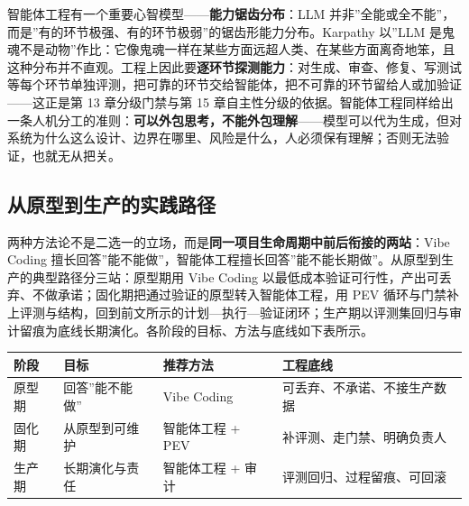 \documentclass[12pt,a4paper,twoside,openany]{ctexbook}
\numberwithin{figure}{chapter}
\numberwithin{table}{chapter}
\newcounter{none}
\begin{document}
智能体工程有一个重要心智模型------\textbf{能力锯齿分布}：LLM
并非''全能或全不能''，而是''有的环节极强、有的环节极弱''的锯齿形能力分布。Karpathy
以''LLM
是鬼魂不是动物''作比：它像鬼魂一样在某些方面远超人类、在某些方面离奇地笨，且这种分布并不直观。工程上因此要\textbf{逐环节探测能力}：对生成、审查、修复、写测试等每个环节单独评测，把可靠的环节交给智能体，把不可靠的环节留给人或加验证------这正是第
13 章分级门禁与第 15
章自主性分级的依据。智能体工程同样给出一条人机分工的准则：\textbf{可以外包思考，不能外包理解}------模型可以代为生成，但对系统为什么这么设计、边界在哪里、风险是什么，人必须保有理解；否则无法验证，也就无从把关。

\subsection{从原型到生产的实践路径}\label{ux4eceux539fux578bux5230ux751fux4ea7ux7684ux5b9eux8df5ux8defux5f84}

两种方法论不是二选一的立场，而是\textbf{同一项目生命周期中前后衔接的两站}：Vibe
Coding
擅长回答''能不能做''，智能体工程擅长回答''能不能长期做''。从原型到生产的典型路径分三站：原型期用
Vibe Coding
以最低成本验证可行性，产出可丢弃、不做承诺；固化期把通过验证的原型转入智能体工程，用
PEV
循环与门禁补上评测与结构，回到前文所示的计划---执行---验证闭环；生产期以评测集回归与审计留痕为底线长期演化。各阶段的目标、方法与底线如下表所示。

{\def\LTcaptype{none} %
\begin{longtable}[]{@{}
  >{\raggedright\arraybackslash}p{}
  >{\raggedright\arraybackslash}p{}
  >{\raggedright\arraybackslash}p{}
  >{\raggedright\arraybackslash}p{}@{}}
\toprule\noalign{}
\begin{minipage}[b]{\linewidth}\raggedright
阶段
\end{minipage} & \begin{minipage}[b]{\linewidth}\raggedright
目标
\end{minipage} & \begin{minipage}[b]{\linewidth}\raggedright
推荐方法
\end{minipage} & \begin{minipage}[b]{\linewidth}\raggedright
工程底线
\end{minipage} \\
\midrule\noalign{}
\endhead
\bottomrule\noalign{}
\endlastfoot
原型期 & 回答''能不能做'' & Vibe Coding &
可丢弃、不承诺、不接生产数据 \\
固化期 & 从原型到可维护 & 智能体工程 + PEV &
补评测、走门禁、明确负责人 \\
生产期 & 长期演化与责任 & 智能体工程 + 审计 &
评测回归、过程留痕、可回滚 \\
\end{longtable}
}
\end{document}
